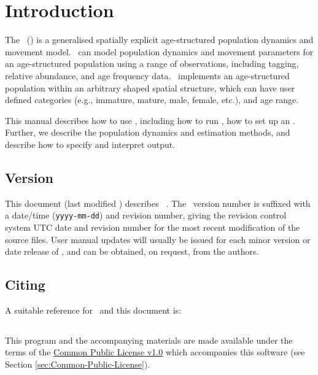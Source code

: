 \section{Introduction\label{sec:Introduction}}

The \SPMName\ (\SPM) is a generalised spatially explicit age-structured population dynamics and movement model. \SPM\ can model population dynamics and movement parameters for an age-structured population using a range of observations, including tagging, relative abundance, and age frequency data. \SPM\ implements an age-structured population within an arbitrary shaped spatial structure, which can have user defined categories (e.g., immature, mature, male, female, etc.), and age range. 

This manual describes how to use \SPM, including how to run \SPM, how to set up an \config. Further, we describe the population dynamics and estimation methods, and describe how to specify and interpret output. 

\subsection{Version\label{sec:version}}

This document (last modified \DocVer) describes \SPM\ \VER. The \SPM\ version number is suffixed with a date/time (\texttt{yyyy-mm-dd}) and revision number, giving the revision control system UTC date and revision number for the most recent modification of the source files. User manual updates will usually be issued for each minor version or date release of \SPM, and can be obtained, on request, from the authors.

\subsection{Citing \SPM}

A suitable reference for \SPM\ and this document is:

\ManualRef{}

\subsection{}

This program and the accompanying materials are made available under the terms of the \href{http://www.opensource.org/licenses/cpl1.0.php}{Common Public License v1.0} which accompanies this software (see Section \ref{sec:Common-Public-License}).

